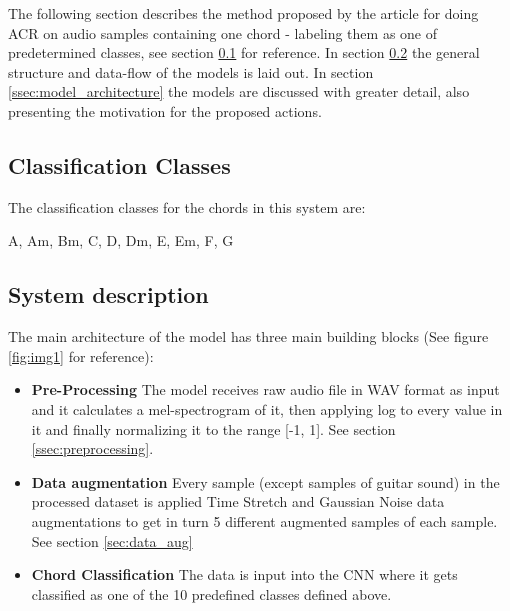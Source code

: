 \documentclass[a4paper]{article}
\begin{document}
The following section describes the method proposed by the article for doing ACR on audio samples containing one chord - labeling them as one of predetermined classes, see section \ref{ssec:classes} for reference.
In section \ref{ssec:system_description} the general structure and data-flow of the models is laid out.
In section \ref{ssec:model_architecture} the models are discussed with greater detail, also presenting the motivation for the proposed actions. 
\subsection{Classification Classes} \label{ssec:classes}
The classification classes for the chords in this system are: 
\begin{center}
    A, Am, Bm, C, D, Dm, E, Em, F, G
\end{center}
\subsection{System description} \label{ssec:system_description}

The main architecture of the model has three main building blocks (See figure \ref{fig:img1} for reference):
\begin{itemize}
    \item \textbf{Pre-Processing} The model receives raw audio file in WAV format as input and it calculates a mel-spectrogram of it, then applying log to every value in it and finally normalizing it to the range [-1, 1]. See section \ref{ssec:preprocessing}.

    \item \textbf{Data augmentation} Every sample (except samples of guitar sound) in the processed dataset is applied Time Stretch and Gaussian Noise data augmentations to get in turn 5 different augmented samples of each sample. See section \ref{sec:data_aug}

    \item \textbf{Chord Classification} The data is input into the CNN where it gets classified as one of the 10 predefined classes defined above.
\end{itemize}
\end{document}
